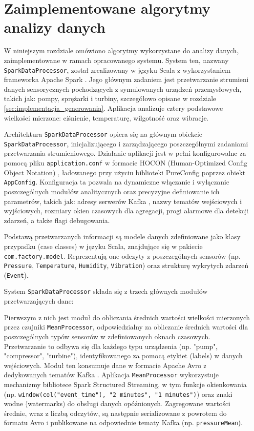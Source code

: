 \section{Zaimplementowane algorytmy analizy danych}
\label{sec:algorytmy_analizy}

W niniejszym rozdziale omówiono algorytmy wykorzystane do analizy danych, zaimplementowane w ramach opracowanego systemu. System ten, nazwany \texttt{SparkDataProcessor}, został zrealizowany w języku Scala z wykorzystaniem frameworka Apache Spark \cite{spark_streaming}. Jego głównym zadaniem jest przetwarzanie strumieni danych sensorycznych pochodzących z symulowanych urządzeń przemysłowych, takich jak: pompy, sprężarki i turbiny, szczegółowo opisane w rozdziale \ref{sec:implementacja_generowania}. Aplikacja analizuje cztery podstawowe wielkości mierzone: ciśnienie, temperaturę, wilgotność oraz wibracje.

Architektura \texttt{SparkDataProcessor} opiera się na głównym obiekcie \texttt{SparkDataProcessor}, inicjalizującego i zarządzającego poszczególnymi zadaniami przetwarzania strumieniowego. Działanie aplikacji jest w pełni konfigurowalne za pomocą pliku \texttt{application.conf} w formacie HOCON (Human-Optimized Config Object Notation) \cite{hocon_spec}, ładowanego przy użyciu biblioteki PureConfig \cite{pureconfig_docs} poprzez obiekt \texttt{AppConfig}. Konfiguracja ta pozwala na dynamiczne włączanie i wyłączanie poszczególnych modułów analitycznych oraz precyzyjne definiowanie ich parametrów, takich jak: adresy serwerów Kafka \cite{kafka}, nazwy tematów wejściowych i wyjściowych, rozmiary okien czasowych dla agregacji, progi alarmowe dla detekcji zdarzeń, a także flagi debugowania.

Podstawą przetwarzanych informacji są modele danych zdefiniowane jako klasy przypadku (case classes) w języku Scala, znajdujące się w pakiecie \texttt{com.factory.model}. Reprezentują one odczyty z poszczególnych sensorów (np. \texttt{Pressure}, \texttt{Temperature}, \texttt{Humidity}, \texttt{Vibration}) oraz strukturę wykrytych zdarzeń (\texttt{Event}).

System \texttt{SparkDataProcessor} składa się z trzech głównych modułów przetwarzających dane:

Pierwszym z nich jest moduł do obliczania średnich wartości wielkości mierzonych przez czujniki \texttt{MeanProcessor}, odpowiedzialny za obliczanie średnich wartości dla poszczególnych typów sensorów w zdefiniowanych oknach czasowych. Przetwarzanie to odbywa się dla każdego typu urządzenia (np. "pump", "compressor", "turbine"), identyfikowanego za pomocą etykiet (labels) w danych wejściowych. Moduł ten konsumuje dane w formacie Apache Avro \cite{avro_documentation} z dedykowanych tematów Kafka \cite{kafka}. Aplikacja \texttt{MeanProcessor} wykorzystuje mechanizmy bibliotece Spark Structured Streaming, w tym funkcje okienkowania (np. \texttt{window(col("event\_time"), "2 minutes", "1 minutes")}) oraz znaki wodne (watermarks) \cite{watermarking} do obsługi danych opóźnionych. Zagregowane wartości średnie, wraz z liczbą odczytów, są następnie serializowane z powrotem do formatu Avro i publikowane na odpowiednie tematy Kafka (np. \texttt{pressureMean}).

